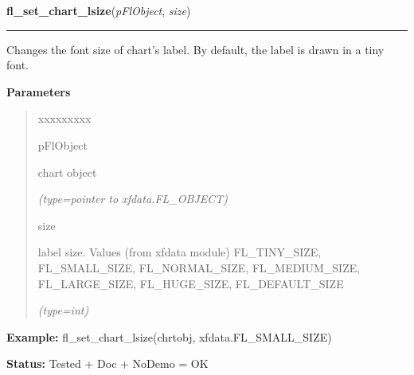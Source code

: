     \vspace{0.5ex}

\hspace{.8\funcindent}\begin{boxedminipage}{\funcwidth}

    \raggedright \textbf{fl\_set\_chart\_lsize}(\textit{pFlObject}, \textit{size})

    \vspace{-1.5ex}

    \rule{\textwidth}{0.5\fboxrule}
\setlength{\parskip}{2ex}
    Changes the font size of chart's label. By default, the label is drawn 
    in a tiny font.

\setlength{\parskip}{1ex}
      \textbf{Parameters}
      \vspace{-1ex}

      \begin{quote}
        \begin{Ventry}{xxxxxxxxx}

          \item[pFlObject]

          chart object

            {\it (type=pointer to xfdata.FL\_OBJECT)}

          \item[size]

          label size. Values (from xfdata module) FL\_TINY\_SIZE, 
          FL\_SMALL\_SIZE, FL\_NORMAL\_SIZE, FL\_MEDIUM\_SIZE, 
          FL\_LARGE\_SIZE, FL\_HUGE\_SIZE, FL\_DEFAULT\_SIZE

            {\it (type=int)}

        \end{Ventry}

      \end{quote}

\textbf{Example:} fl\_set\_chart\_lsize(chrtobj, xfdata.FL\_SMALL\_SIZE)



\textbf{Status:} Tested + Doc + NoDemo = OK



    \end{boxedminipage}

    \label{xformslib:flchart:fl_set_chart_lcolor}

    \vspace{0.5ex}

